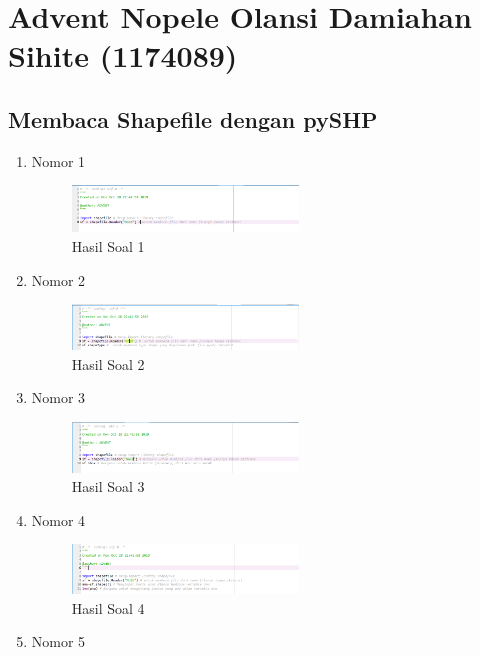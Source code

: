 \section{Advent Nopele Olansi Damiahan Sihite (1174089)}
\subsection{Membaca Shapefile dengan pySHP}
\begin{enumerate}
	\item Nomor 1
	
	\begin{figure}[H]
		\includegraphics[width=6cm]{figures/Tugas3/1174089/Soal1.PNG}
		\centering
		\caption{Hasil Soal 1}
	\end{figure}
	\item Nomor 2
	
	\begin{figure}[H]
		\includegraphics[width=6cm]{figures/Tugas3/1174089/Soal2.PNG}
		\centering
		\caption{Hasil Soal 2}
	\end{figure}
	\item Nomor 3
	
	\begin{figure}[H]
		\includegraphics[width=6cm]{figures/Tugas3/1174089/Soal3.PNG}
		\centering
		\caption{Hasil Soal 3}
	\end{figure}
	\item Nomor 4
	
	\begin{figure}[H]
		\includegraphics[width=6cm]{figures/Tugas3/1174089/Soal4.PNG}
		\centering
		\caption{Hasil Soal 4}
	\end{figure}
	\item Nomor 5
	

\end{enumerate}
